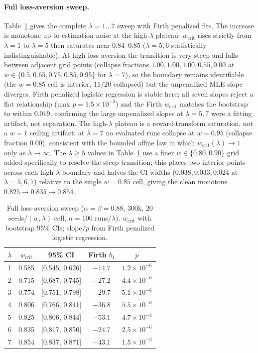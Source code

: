 \documentclass[letterpaper]{article} %
\theoremstyle{plain}
\newcommand{\wcrit}{w_{\mathrm{crit}}}
\begin{document}
\paragraph{Full loss-aversion sweep.}
Table~\ref{tab:lambda_sweep} gives the complete $\lambda{=}1{\dots}7$ sweep with Firth penalized
fits. The increase is monotone up to estimation noise at the high-$\lambda$ plateau:
$\wcrit$ rises strictly from $\lambda{=}1$ to $\lambda{=}5$ then saturates near $0.84$--$0.85$
($\lambda{=}5,6$ statistically indistinguishable). At high loss aversion the transition is
very steep and falls between adjacent grid points (collapse fractions $1.00,1.00,1.00,0.55,
0.00$ at $w\in\{0.5,0.65,0.75,0.85,0.95\}$ for $\lambda{=}7$), so the boundary remains
identifiable (the $w{=}0.85$ cell is interior, $11/20$ collapsed) but the unpenalized MLE
slope diverges. Firth penalized logistic regression is stable here; all seven slopes reject a flat
relationship (max $p=1.5\times10^{-3}$) and the Firth $\wcrit$ matches the bootstrap to within $0.019$,
confirming the large unpenalized slopes at $\lambda{=}5,7$ were a fitting artifact, not
separation. The high-$\lambda$ plateau is a reward-transform saturation, not a $w{=}1$ ceiling
artifact: at $\lambda{=}7$ no evaluated runs collapse at $w{=}0.95$ (collapse fraction $0.00$),
consistent with the bounded affine law in which $\wcrit(\lambda)\to1$ only as
$\lambda\to\infty$. The $\lambda{\geq}5$ values in Table~\ref{tab:lambda_sweep} use a finer
$w\in\{0.80,0.90\}$ grid added specifically to resolve the steep transition; this places two
interior points across each high-$\lambda$ boundary and halves the CI widths
($0.038,0.033,0.024$ at $\lambda{=}5,6,7$) relative to the single $w{=}0.85$ cell, giving the
clean monotone $0.825\to0.835\to0.854$.

\begin{table}[t]
\centering
\caption{Full loss-aversion sweep ($\alpha{=}\beta{=}0.88$, 300k, 20 seeds/$(w,\lambda)$
cell, $n{=}100$ runs/$\lambda$). $\wcrit$ with bootstrap 95\% CIs; slope/$p$ from Firth
penalized logistic regression.}
\label{tab:lambda_sweep}
\small
\begin{tabular}{ccccc}
\toprule
$\lambda$ & $\wcrit$ & 95\% CI & Firth $b_1$ & $p$ \\
\midrule
1 & 0.585 & [0.545, 0.626] & $-14.7$ & $1.2\times10^{-6}$ \\
2 & 0.715 & [0.687, 0.745] & $-27.2$ & $4.4\times10^{-6}$ \\
3 & 0.774 & [0.751, 0.798] & $-29.7$ & $5.1\times10^{-6}$ \\
4 & 0.806 & [0.766, 0.841] & $-36.8$ & $5.5\times10^{-6}$ \\
5 & 0.825 & [0.806, 0.844] & $-53.1$ & $4.7\times10^{-4}$ \\
6 & 0.835 & [0.817, 0.850] & $-24.7$ & $2.5\times10^{-6}$ \\
7 & 0.854 & [0.837, 0.871] & $-43.1$ & $1.5\times10^{-3}$ \\
\bottomrule
\end{tabular}
\end{table}
\end{document}
